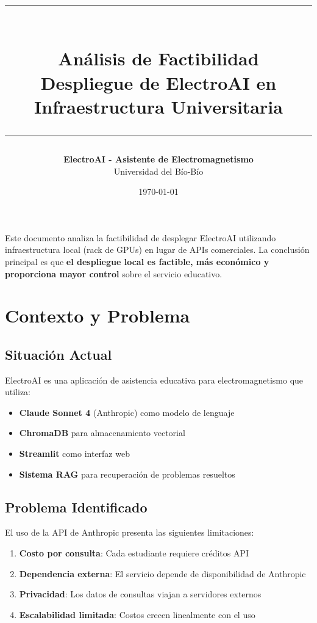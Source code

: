 \documentclass[12pt,letterpaper]{article}
\title{
    \vspace{-1cm}
    \textcolor{primary}{\rule{\linewidth}{2pt}}\\[0.5cm]
    {\Huge\textbf{An\'alisis de Factibilidad}}\\[0.3cm]
    {\LARGE Despliegue de ElectroAI en Infraestructura Universitaria}\\[0.5cm]
    \textcolor{primary}{\rule{\linewidth}{2pt}}
}
\author{
    \textbf{ElectroAI - Asistente de Electromagnetismo}\\
    Universidad del B\'io-B\'io
}
\date{\today}
\begin{document}
\maketitle
\thispagestyle{empty}

\vspace{1cm}

\begin{tcolorbox}[colback=primary!10, colframe=primary, title=\textbf{Resumen Ejecutivo}]
Este documento analiza la factibilidad de desplegar ElectroAI utilizando infraestructura local (rack de GPUs) en lugar de APIs comerciales. La conclusi\'on principal es que \textbf{el despliegue local es factible, m\'as econ\'omico y proporciona mayor control} sobre el servicio educativo.
\end{tcolorbox}

\newpage
\tableofcontents
\newpage

\section{Contexto y Problema}

\subsection{Situaci\'on Actual}

ElectroAI es una aplicaci\'on de asistencia educativa para electromagnetismo que utiliza:
\begin{itemize}
    \item \textbf{Claude Sonnet 4} (Anthropic) como modelo de lenguaje
    \item \textbf{ChromaDB} para almacenamiento vectorial
    \item \textbf{Streamlit} como interfaz web
    \item \textbf{Sistema RAG} para recuperaci\'on de problemas resueltos
\end{itemize}

\subsection{Problema Identificado}

El uso de la API de Anthropic presenta las siguientes limitaciones:
\begin{enumerate}
    \item \textbf{Costo por consulta}: Cada estudiante requiere cr\'editos API
    \item \textbf{Dependencia externa}: El servicio depende de disponibilidad de Anthropic
    \item \textbf{Privacidad}: Los datos de consultas viajan a servidores externos
    \item \textbf{Escalabilidad limitada}: Costos crecen linealmente con el uso
\end{enumerate}
\end{document}
